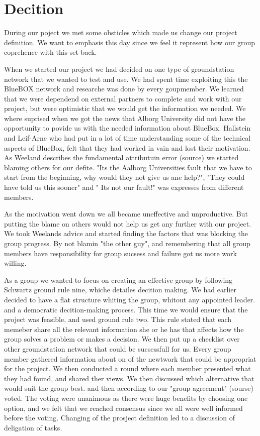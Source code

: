 \section{Decition}

During our poject we met some obsticles which made us change our project definition. We want to emphasis this day since we feel it represent how our group coprehence with this set-back.

When we started our project we had decided on one type of groundstation network that we wanted to test and use.  We had spent time exploiting this the BlueBOX network and researche was done by every goupmember. We learned that we were dependend on external partners to complete and work with our project, but were optimistic that we would get the information we needed. We where suprised when we got the news that Alborg University did not have the opportunity to povide us with the needed information about BlueBox. Hallstein and Leif-Arne who had put in a lot of time understanding some of the technical aspects of BlueBox, felt that they had worked in vain and lost their motivation. As Weeland describes the fundamental attributuin error (source) we started blaming others for our defite. "Its the Aalborg Universities fault that we have to start from the beginning, why would they not give us ane help?", "They could have told us this sooner" and " Its not our fault!" was expresses from different members. 

As the motivation went down we all became uneffective and unproductive. But putting the blame on others would not help us get any further with our project. We took Weelands advice and started finding the factors that was blocking the group progress. By not blamin "the other guy", and remembering that all group members have responsibility for group sucsess and failure got us more work willing. 

As a group we wanted to focus on creating an effective group by following Schwartz ground rule nine, whiche detailes decition making. We had earlier decided to have a flat structure whiting the group, whitout any appointed leader. and a democratic decition-making process. This time we would ensure that the project was feasible, and used ground rule two. This rule stated that each memeber share all the relevant information she or he has that affects how the group solves a problem or makes a decision.  We then put up a checklist over other groundstation network that could be sucsessfull for us. Every group member gathered information about on of the newtwork that could be appropriat for the project. We then conducted a round where each member presented what they had found, and shared ther views.  We then discussed which alternative that would suit the group best. and then according to our "group agreement" (sourse) voted. The voting were unanimous as there were huge benefits by choosing one option, and we felt that we reached consensus since we all were well informed before the voting. Changing of the prosject definition led to a discussion of deligation of tasks. 

